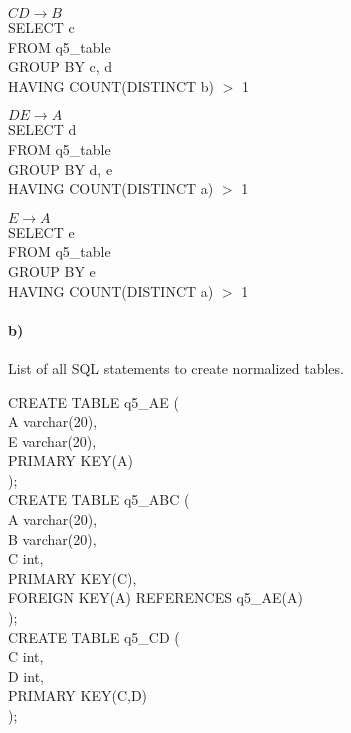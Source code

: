 \documentclass[a4paper,12pt]{article}
\begin{document}
\begin{tcolorbox}
$CD \to B$ \\

SELECT c\\
FROM q5\_table\\ 
GROUP BY c, d\\
HAVING COUNT(DISTINCT b) $>$ 1 \\
\end{tcolorbox}

\begin{tcolorbox}
$DE \to A$ \\

SELECT d\\
FROM q5\_table\\ 
GROUP BY d, e\\
HAVING COUNT(DISTINCT a) $>$ 1 \\
\end{tcolorbox}

\begin{tcolorbox}
$E \to A$ \\

SELECT e\\
FROM q5\_table\\ 
GROUP BY e\\
HAVING COUNT(DISTINCT a) $>$ 1 \\
\end{tcolorbox}

\paragraph{b)} List of all SQL statements to create normalized tables.

\begin{tcolorbox}
CREATE TABLE q5\_AE (\\
	A varchar(20),\\
	E varchar(20),\\
	PRIMARY KEY(A) \\
);\\

CREATE TABLE q5\_ABC ( \\
	A varchar(20),\\
	B varchar(20), \\
	C int, \\
	PRIMARY KEY(C), \\
	FOREIGN KEY(A) REFERENCES q5\_AE(A) \\ 
);\\

CREATE TABLE q5\_CD (\\
	C int, \\
	D int, \\
	PRIMARY KEY(C,D) \\
);
\end{tcolorbox}
\end{document}
